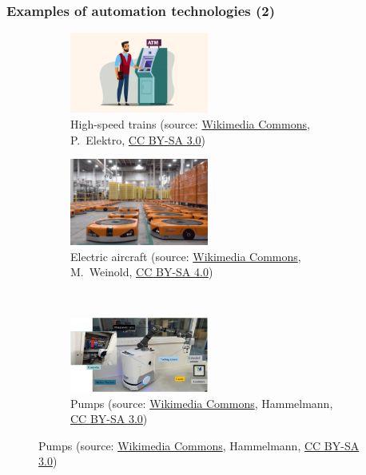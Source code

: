 \begin{frame}
	\frametitle{Examples of automation technologies (2)}
	\begin{figure}
		\ContinuedFloat
		\centering
		\begin{subfigure}[b]{0.49\textwidth}
			\centering
			\includegraphics[width=0.5\textwidth]{fig/lec01/ATM}
			\caption{High-speed trains (source: \href{https://commons.wikimedia.org/wiki/File:Fast_Train_Spain_Class_103_AVE_Siemens_Bridge_Macanet-Massanes.JPG}{Wikimedia Commons}, P.~Elektro, \href{https://creativecommons.org/licenses/by-sa/3.0/deed.en}{CC BY-SA 3.0})}
		\end{subfigure}
		\hfill
		\begin{subfigure}[b]{0.49\textwidth}
			\centering
			\includegraphics[width=0.5\textwidth]{fig/lec01/Amazon.png}
			\caption{Electric aircraft (source: \href{https://commons.wikimedia.org/wiki/File:Electric_Airbus_A320.jpg}{Wikimedia Commons}, M.~Weinold, \href{https://creativecommons.org/licenses/by-sa/4.0/deed.en}{CC BY-SA 4.0})}
		\end{subfigure}
		\\
		\begin{subfigure}[b]{0.49\textwidth}
			\centering
			\includegraphics[width=0.5\textwidth]{fig/lec01/PLC.jpg}
			\caption{Pumps (source: \href{https://commons.wikimedia.org/wiki/File:Hammelmann_Stationary_unit_with_electric_motor.jpg}{Wikimedia Commons}, Hammelmann, \href{https://creativecommons.org/licenses/by-sa/3.0/deed.en}{CC BY-SA 3.0})}

\end{subfigure}
\end{figure}
\end{frame}
